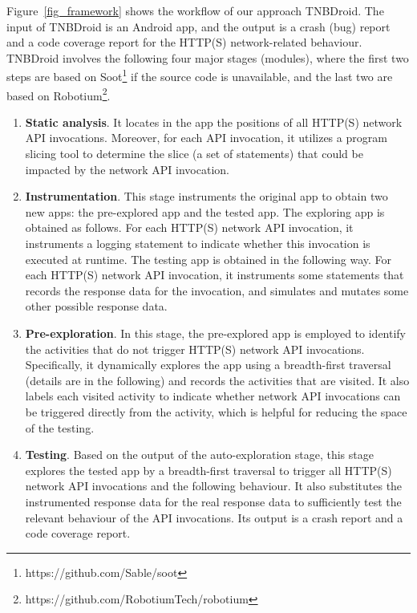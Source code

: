 \documentclass[sigconf,review, anonymous]{acmart}
\begin{document}
Figure~\ref{fig_framework} shows the workflow of our approach \textsf{TNBDroid}. The input of \textsf{TNBDroid} is an Android app, and the output is a crash (bug) report and a code coverage report for the HTTP(S) network-related behaviour. \textsf{TNBDroid} involves the following four major stages (modules), where the first two steps are based on \textsf{Soot}\footnote{https://github.com/Sable/soot} if the source code is unavailable, and the last two are based on \textsf{Robotium}\footnote{https://github.com/RobotiumTech/robotium}. 
\begin{enumerate}
\item \textbf{Static analysis}. It locates in the app the positions of all HTTP(S) network API invocations. Moreover, for each API invocation, it utilizes a program slicing tool to determine the slice (a set of statements) that could be impacted by the network API invocation.    
\item \textbf{Instrumentation}. This stage instruments the original app to obtain two new apps: the pre-explored app and the tested app. The exploring app is obtained as follows. For each HTTP(S) network API invocation, it instruments a logging statement to indicate whether this invocation is executed at runtime. The testing app is obtained in the following way. For each HTTP(S) network API invocation, it instruments some statements that records the response data for the invocation, and simulates and mutates some other possible response data. 
\item \textbf{Pre-exploration}. In this stage, the pre-explored app is employed to identify the activities that do not trigger HTTP(S) network API invocations. Specifically, it dynamically explores the app using a breadth-first traversal (details are in the following) and records the activities that are visited. It also labels each visited activity to indicate whether network API invocations can be triggered directly from the activity, which is helpful for reducing the  space of the testing. 
\item \textbf{Testing}. Based on the output of the auto-exploration stage, this stage explores the tested app by a breadth-first traversal to trigger all HTTP(S) network API invocations and the following behaviour. It also substitutes the instrumented response data for the real response data to sufficiently test the relevant behaviour of the API invocations. Its output is a crash report and a code coverage report.   
\end{enumerate}
\end{document}
